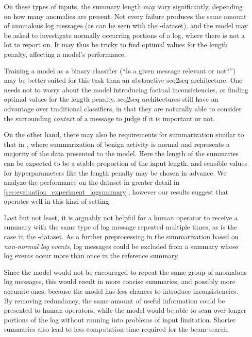 On these types of inputs, the summary length may vary significantly, depending on how many anomalies are present.
Not every failure produces the same amount of anomalous log messages (as can be seen with the \hadoop{}-dataset),
and the model may be asked to investigate normally occurring portions of a log,
where there is not a lot to report on.
It may thus be tricky to find optimal values for the length penalty, affecting a model's performance.

Training a model as a binary classifier (\enquote{Is a given message relevant or not?}) may be better suited for this task than an abstractive \acl{seq2seq} architecture.
One needs not to worry about the model introducing factual inconsistencies, or finding optimal values for the length penalty.
\Acl{seq2seq} architectures still have an advantage over traditional classifiers,
in that they are naturally able to consider the surrounding \emph{context} of a message to judge if it is important or not.

On the other hand, there may also be requirements for summarization similar to that in \logsummary{},
where summarization of benign activity is normal and represents a majority of the data presented to the model.
Here the length of the summaries can be expected to be a stable proportion of the input length,
and sensible values for hyperparameters like the length penalty may be chosen in advance.
We analyze the performance on the \logsummary{} dataset in greater detail in \autoref{sec:evaluation_experiment_logsummary},
however our results suggest that  operates well in this kind of setting.

Last but not least, it is arguably not helpful for a human operator to receive a summary
with the same type of log message repeated multiple times,
as is the case in the \hadoop{}-dataset.
As a further preprocessing in the summarization based on \emph{non-normal log events},
log messages could be excluded from a summary
whose log events occur more than once in the reference summary.

Since the model would not be encouraged to repeat the same group of anomalous log messages,
this would result in more concise summaries, and possibly more accurate ones,
because the model has less chances to introduce inconsistencies.
By removing redundancy, the same amount of useful information could be presented to human operators,
while the model would be able to scan over longer portions of the log without running into problems of input limitation.
Shorter summaries also lead to less computation time required for the beam-search.

